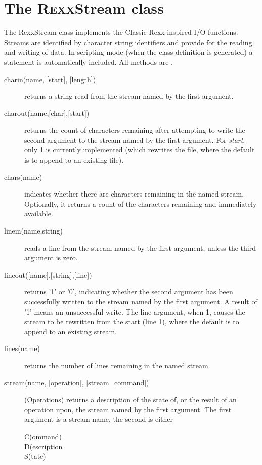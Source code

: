 \section{The R\textsc{exx}Stream class}\label{refrexxstream}

The RexxStream class implements the Classic Rexx inspired I/O
functions. Streams are identified by character string identifiers and
provide for the reading and writing of data. In scripting mode (when
the class definition is generated) a  statement is
automatically included. All methods are .

\begin{description}
  
\item[charin(name, [start{]}, [length{]})] returns a string read from the stream named by the first
argument.
\item[charout(name,[char{]},[start{]})] returns the count of characters remaining after attempting to
write the second argument to the stream named by the first
argument. For \emph{start}, only 1 is currently implemented (which
rewrites the file, where the default is to append to an existing file). 
\item[chars(name)] indicates whether there are characters remaining in the named
stream. Optionally, it returns a count of the characters remaining and
immediately available.
\item[linein(name,string)] reads a line from the stream named by the first argument,
unless the third argument is zero.
\item[lineout([name{]},[string{]},[line{]})] returns '1' or '0', indicating whether the
  second argument has been successfully written to the stream named by
  the first argument. A result of '1' means an unsuccessful write. The
  line argument, when 1, causes the stream to be rewritten from the
  start (line 1), where the default is to append to an existing stream. 
\item[lines(name)] returns the number of lines remaining in the named stream.

\item[stream(name, [operation{]}, [stream\_command{]})]    (Operations) returns a description of the state of, or the result of an
operation upon, the stream named by the first argument. The first
argument is a stream name, the second is either
\begin{description}
\item[C(ommand)]
\item[D(escription]
\item[S(tate)]
\end{description}


\end{description}
